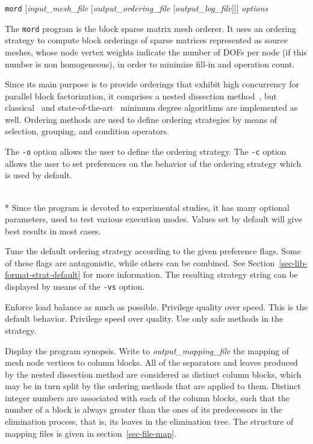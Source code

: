 \begin{itemize}
\progsyn
\texttt{mord} [{\it input\_mesh\_file} [{\it output\_ordering\_file} [{\it output\_log\_file}]]] {\it options}

\progdes
The \texttt{mord} program is the block sparse matrix mesh orderer. It
uses an ordering strategy to compute block orderings of sparse matrices
represented as source meshes, whose node vertex weights indicate the
number of DOFs per node (if this number is non homogeneous), in order
to minimize fill-in and operation count.

Since its main purpose is to provide orderings that exhibit high
concurrency for parallel block factorization, it comprises a nested
dissection method~\cite{geli81}, but classical~\cite{liu-85} and
state-of-the-art~\cite{amdadu96,peroam99} minimum degree algorithms
are implemented as well.
Ordering methods are used to define ordering strategies by means of
selection, grouping, and condition operators.

The \texttt{-o} option allows the user to define the ordering
strategy. The \texttt{-c} option allows the user to set preferences on
the behavior of the ordering strategy which is used by default.

\progopt\\*
Since the program is devoted to experimental studies, it has many
optional parameters, used to test various execution modes. Values
set by default will give best results in most cases.
\begin{itemize}
Tune the default ordering strategy according to the given preference
flags. Some of these flags are antagonistic, while others can be
combined. See Section~\ref{sec-lib-format-strat-default} for more
information. The resulting strategy string can be displayed by means
of the \texttt{-vs} option.
\begin{itemize}
\iteme[\texttt{b}]
Enforce load balance as much as possible.
\iteme[\texttt{q}]
Privilege quality over speed. This is the default behavior.
\iteme[\texttt{s}]
Privilege speed over quality.
\iteme[\texttt{t}]
Use only safe methods in the strategy.
\end{itemize}
\iteme[\texttt{-h}]
Display the program synopsis.
Write to {\it output\_mapping\_file\/} the mapping of mesh node
vertices to column blocks. All of the separators and leaves produced
by the nested dissection method are considered as distinct column
blocks, which may be in turn split by the ordering methods that are
applied to them. Distinct integer numbers are associated with each
of the column blocks, such that the number of a block is always
greater than the ones of its predecessors in the elimination process,
that is, its leaves in the elimination tree.
The structure of mapping files is given in section~\ref{sec-file-map}.


\end{itemize}
\end{itemize}
